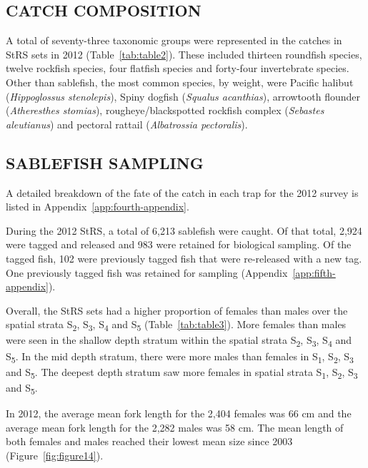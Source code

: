\documentclass[12pt]{article}\usepackage[]{graphicx}\usepackage[]{color}
\begin{document}
\hypertarget{catch-composition}{%
\subsection{CATCH COMPOSITION}\label{catch-composition}}

A total of seventy-three taxonomic groups were represented in the catches in StRS sets in 2012 (Table~\ref{tab:table2}). These included thirteen roundfish species, twelve rockfish species, four flatfish species and forty-four invertebrate species. Other than sablefish, the most common species, by weight, were Pacific halibut (\emph{Hippoglossus stenolepis}), Spiny dogfish (\emph{Squalus acanthias}), arrowtooth flounder (\emph{Atheresthes stomias}), rougheye/blackspotted rockfish complex (\emph{Sebastes aleutianus}) and pectoral rattail (\emph{Albatrossia pectoralis}).

\hypertarget{sablefish-sampling}{%
\subsection{SABLEFISH SAMPLING}\label{sablefish-sampling}}

A detailed breakdown of the fate of the catch in each trap for the 2012 survey is listed in Appendix~\ref{app:fourth-appendix}.

During the 2012 StRS, a total of 6,213 sablefish were caught. Of that total, 2,924 were tagged and released and 983 were retained for biological sampling. Of the tagged fish, 102 were previously tagged fish that were re-released with a new tag. One previously tagged fish was retained for sampling (Appendix~\ref{app:fifth-appendix}).

Overall, the StRS sets had a higher proportion of females than males over the spatial strata S\textsubscript{2}, S\textsubscript{3}, S\textsubscript{4} and S\textsubscript{5} (Table~\ref{tab:table3}). More females than males were seen in the shallow depth stratum within the spatial strata S\textsubscript{2}, S\textsubscript{3}, S\textsubscript{4} and S\textsubscript{5}. In the mid depth stratum, there were more males than females in S\textsubscript{1}, S\textsubscript{2}, S\textsubscript{3} and S\textsubscript{5}. The deepest depth stratum saw more females in spatial strata S\textsubscript{1}, S\textsubscript{2}, S\textsubscript{3} and S\textsubscript{5}.

In 2012, the average mean fork length for the 2,404 females was 66 cm and the average mean fork length for the 2,282 males was 58 cm. The mean length of both females and males reached their lowest mean size since 2003 (Figure~\ref{fig:figure14}).
\end{document}
